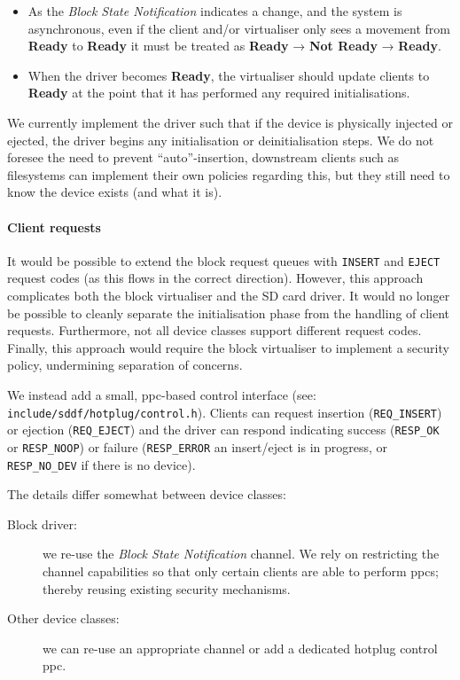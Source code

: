 \documentclass[a4paper,12pt]{report}
\begin{document}
\begin{itemize}
\item As the \emph{Block State Notification} indicates a change, and the
  system is asynchronous, even if the client and/or virtualiser only
  sees a movement from \textbf{Ready} to \textbf{Ready} it must be
  treated as \textbf{Ready} → \textbf{Not Ready} → \textbf{Ready}.

\item When the driver becomes \textbf{Ready}, the virtualiser should
  update clients to \textbf{Ready} at the point that it has performed
  any required initialisations.
\end{itemize}


We currently implement the driver such that if the device is
physically injected or ejected, the driver begins any initialisation
or deinitialisation steps. We do not foresee the need to prevent
``auto''-insertion, downstream clients such as filesystems can
implement their own policies regarding this, but they still need to
know the device exists (and what it is).

\paragraph{Client requests}

It would be possible to extend the block request queues with
\texttt{INSERT} and \texttt{EJECT} request codes (as this flows in the
correct direction). However, this approach complicates both the
block virtualiser and the SD card driver. It would no longer be
possible to cleanly separate the initialisation phase from the
handling of client requests. Furthermore, not all device classes
support different request codes. Finally, this approach would require
the block virtualiser to implement a security policy, undermining
separation of concerns.

We instead add a small, \gls{ppc}-based control interface (see:
\texttt{include/sddf/hotplug/control.h}).  Clients can request
insertion (\texttt{REQ\_INSERT}) or ejection (\texttt{REQ\_EJECT}) and
the driver can respond indicating success (\texttt{RESP\_OK} or
\texttt{RESP\_NOOP}) or failure (\texttt{RESP\_ERROR} an insert/eject
is in progress, or \texttt{RESP\_NO\_DEV} if there is no device).

The details differ somewhat between device classes:
\begin{description}
\item[Block driver:] we re-use the \emph{Block State Notification}
  channel. We rely on restricting the channel capabilities so that
  only certain clients are able to perform \gls{ppc}s; thereby reusing
  existing security mechanisms.

\item[Other device classes:] we can re-use an appropriate channel or
  add a dedicated hotplug control \gls{ppc}.
\end{description}
\end{document}
